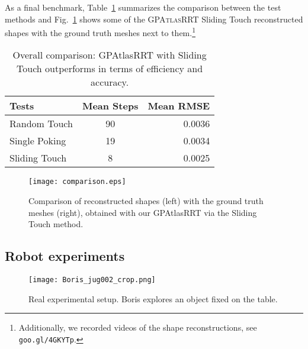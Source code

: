  As a final benchmark, Table~\ref{tab:comp} summarizes the comparison
between the test methods and Fig.~\ref{fig:shapecomp} shows some  of the \textsc{GPAtlasRRT} Sliding Touch reconstructed shapes with
the ground truth meshes next to them.\footnote{Additionally, we recorded videos of the shape reconstructions, see \texttt{goo.gl/4GKYTp}.}
\begin{table}
    \centering
    \begin{tabular}{|l|c|r|}
        \hline
        Tests  & Mean Steps & Mean RMSE \\
        \hline
        Random Touch & 90 & 0.0036\\
        Single Poking &19 & 0.0034\\
        Sliding Touch &8 & 0.0025\\
        \hline
    \end{tabular}
    \caption{Overall comparison: GPAtlasRRT with Sliding Touch outperforms in terms
    of efficiency and accuracy.}
    \label{tab:comp}
\end{table}

\begin{figure}[htb]
    \centering
    \texttt{[image: comparison.eps]}
    \caption{Comparison of reconstructed shapes (left) with the ground truth meshes (right), obtained with our GPAtlasRRT via the Sliding Touch method.}
    \label{fig:shapecomp}
\end{figure}


\subsection{Robot experiments}
\label{sec:vito}

\begin{figure}[htb]
    \centering
    \texttt{[image: Boris\_jug002\_crop.png]}
    \caption{Real experimental setup. Boris explores an object fixed on the table.}
    \label{fig:boris}
\end{figure}

